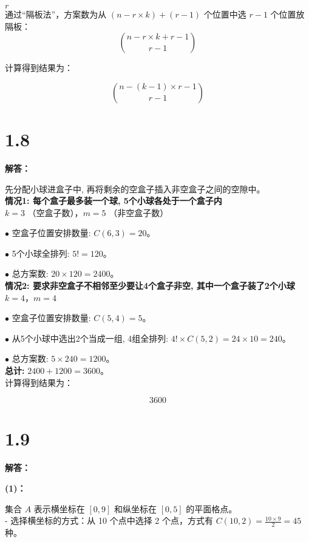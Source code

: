 \documentclass{article}
\begin{document}
 \( r \)  \\
通过“隔板法”，方案数为从 \( (n - r \times k) + (r - 1) \) 个位置中选 \( r - 1 \) 个位置放隔板：
\[
\binom{n - r \times k + r - 1}{r - 1}
\]

计算得到结果为：

\[
\boxed{\binom{n - (k - 1) \times r - 1}{r - 1}}
\]

\section*{1.8}
\textbf{解答：}

先分配小球进盒子中, 再将剩余的空盒子插入非空盒子之间的空隙中。\\

\textbf{情况1: 每个盒子最多装一个球, 5个小球各处于一个盒子内} \\

$k = 3$ （空盒子数），$m = 5$ （非空盒子数）

$\bullet$ 空盒子位置安排数量: $C(6, 3) = 20$。

$\bullet$ 5个小球全排列: $5! = 120$。

$\bullet$ 总方案数: $20 \times 120 = 2400$。\\

\textbf{情况2: 要求非空盒子不相邻至少要让4个盒子非空, 其中一个盒子装了2个小球} \\

$k = 4$，$m = 4$

$\bullet$ 空盒子位置安排数量: $C(5, 4) = 5$。

$\bullet$ 从5个小球中选出2个当成一组, 4组全排列: $4! \times C(5, 2) = 24 \times 10 = 240$。

$\bullet$ 总方案数: $5 \times 240 = 1200$。\\


\textbf{总计: } $2400 + 1200 = 3600$。\\

计算得到结果为：

\[
\boxed{3600}
\]

\section*{1.9}
\textbf{解答：}

\textbf{(1)：}

集合 \( A \) 表示横坐标在 \( [0,9] \) 和纵坐标在 \( [0,5] \) 的平面格点。  \\

- 选择横坐标的方式：从 10 个点中选择 2 个点，方式有 \( C(10, 2) = \frac{10 \times 9}{2} = 45 \) 种。
\end{document}
